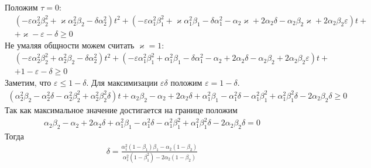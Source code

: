 \documentclass[a4paper,14pt]{extarticle} %
\begin{document}
Положим $\tau = 0$:
 \begin{equation}
 \begin{aligned}
&(-\varepsilon\alpha_2^2\beta_2^2 + \varkappa\alpha_2^2\beta_2 - \delta\alpha_2^2)t^2 + (-\varepsilon\alpha_1^2\beta_1^2 + \varkappa\alpha_1^2\beta_1 - \delta\alpha_1^2 - \alpha_2\varkappa + 2\alpha_2\delta - \alpha_2\beta_2\varkappa + 2\alpha_2\beta_2\varepsilon)t +\\
& + \varkappa - \varepsilon - \delta \geq 0
 \end{aligned}
\end{equation}
Не умаляя общности можем считать $\varkappa = 1$:
 \begin{equation}
 \begin{aligned}
&(-\varepsilon\alpha_2^2\beta_2^2 + \alpha_2^2\beta_2 - \delta\alpha_2^2)t^2 + (-\varepsilon\alpha_1^2\beta_1^2 + \alpha_1^2\beta_1 - \delta\alpha_1^2 - \alpha_2 + 2\alpha_2\delta - \alpha_2\beta_2 + 2\alpha_2\beta_2\varepsilon)t +\\
& + 1 - \varepsilon - \delta \geq 0
 \end{aligned}
\end{equation}
Заметим, что $\varepsilon \leq 1 - \delta$. Для максимизации $\varepsilon\delta$ положим $\varepsilon = 1-\delta$.
 \begin{equation}\label{filter3-3}
 \begin{aligned}
(\alpha_2^2\beta_2 - \alpha_2^2\delta - \alpha_2^2\beta_2^2 + \alpha_2^2\beta_2^2\delta)t + \alpha_2\beta_2 - \alpha_2 + 2\alpha_2\delta + \alpha_1^2\beta_1 - \alpha_1^2\delta - \alpha_1^2\beta_1^2 + \alpha_1^2\beta_1^2\delta - 2\alpha_2\beta_2\delta \geq 0
 \end{aligned}
\end{equation}
Так как максимальное значение достигается на границе положим 
 \begin{equation}
 \begin{aligned}
\alpha_2\beta_2 - \alpha_2 + 2\alpha_2\delta + \alpha_1^2\beta_1 - \alpha_1^2\delta - \alpha_1^2\beta_1^2 + \alpha_1^2\beta_1^2\delta - 2\alpha_2\beta_2\delta = 0
 \end{aligned}
\end{equation}
Тогда 
 \begin{equation}\label{filter3_positive_numerator}
 \begin{aligned}
\delta = \frac{\alpha_1^2(1-\beta_1)\beta_1 - \alpha_2(1-\beta_2)}{\alpha_1^2(1-\beta_1^2) - 2\alpha_2(1-\beta_2)}
 \end{aligned}
 \end{equation}
\end{document}
